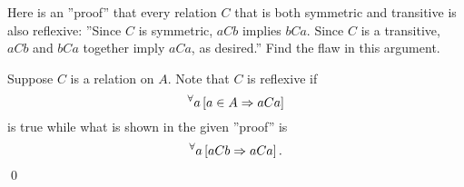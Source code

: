 \documentclass[a4paper,12pt]{article}
\begin{document}
\begin{exe}
	Here is an ''proof'' that every relation \( C \) that is both symmetric and transitive 
	is also reflexive:
	''Since \( C \) is symmetric,
	\( aCb \) implies \( bCa \).
	Since \( C \) is a transitive,
	\( aCb \) and \( bCa \) together imply \( aCa \), as desired.''
	Find the flaw in this argument.
\end{exe}\begin{sol}
	Suppose
	\( C \)
	is a relation on \( A \).
	Note that
	\( C \)
	is reflexive if
	\begin{equation*}
		{}^{\forall}  a
		\left[ a\in A \Rightarrow aCa \right]
	\end{equation*}
	is true while what is shown in the given ''proof'' is
	\begin{equation*}
		{}^{\forall}  a
		\left[ aCb \Rightarrow aCa \right].
	\end{equation*}
	\qed\end{sol}
\end{document}
